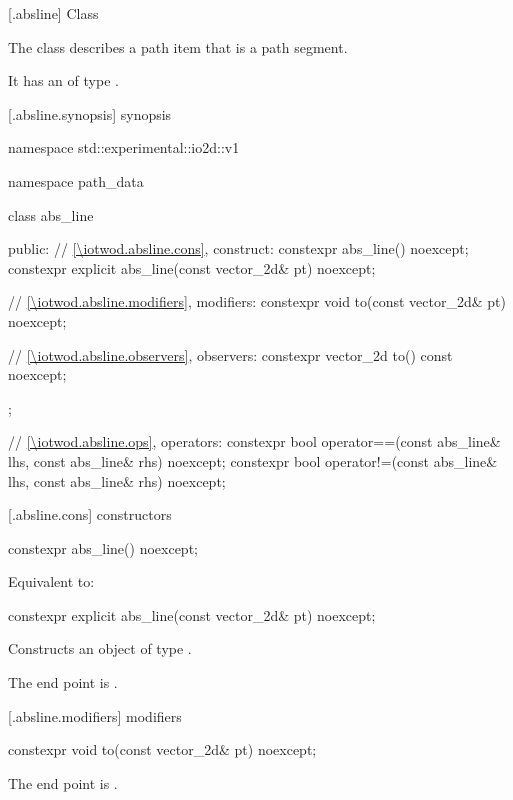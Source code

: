  [\iotwod.absline] {Class }

\pnum
{}%
The class  describes a path item that is a path segment.

\pnum
It has an  of type .

 [\iotwod.absline.synopsis] { synopsis}

\begin{codeblock}
namespace std::experimental::io2d::v1 {
  namespace path_data {
    class abs_line {
    public:
      // \ref{\iotwod.absline.cons}, construct:
      constexpr abs_line() noexcept;
      constexpr explicit abs_line(const vector_2d& pt) noexcept;

      // \ref{\iotwod.absline.modifiers}, modifiers:
      constexpr void to(const vector_2d& pt) noexcept;

      // \ref{\iotwod.absline.observers}, observers:
      constexpr vector_2d to() const noexcept;
    };
    
    // \ref{\iotwod.absline.ops}, operators:
    constexpr bool operator==(const abs_line& lhs, const abs_line& rhs) 
      noexcept;
    constexpr bool operator!=(const abs_line& lhs, const abs_line& rhs) 
      noexcept;
  }
}
\end{codeblock}

 [\iotwod.absline.cons] { constructors}

%
\begin{itemdecl}
constexpr abs_line() noexcept;
\end{itemdecl}
\begin{itemdescr}
\pnum
\effects
Equivalent to: 
\end{itemdescr}

%
\begin{itemdecl}
constexpr explicit abs_line(const vector_2d& pt) noexcept;
\end{itemdecl}
\begin{itemdescr}
\pnum
\effects
Constructs an object of type .

\pnum
The end point is .
\end{itemdescr}

 [\iotwod.absline.modifiers]{ modifiers}

%
\begin{itemdecl}
constexpr void to(const vector_2d& pt) noexcept;
\end{itemdecl}
\begin{itemdescr}
\pnum
\effects
The end point is .
\end{itemdescr}

